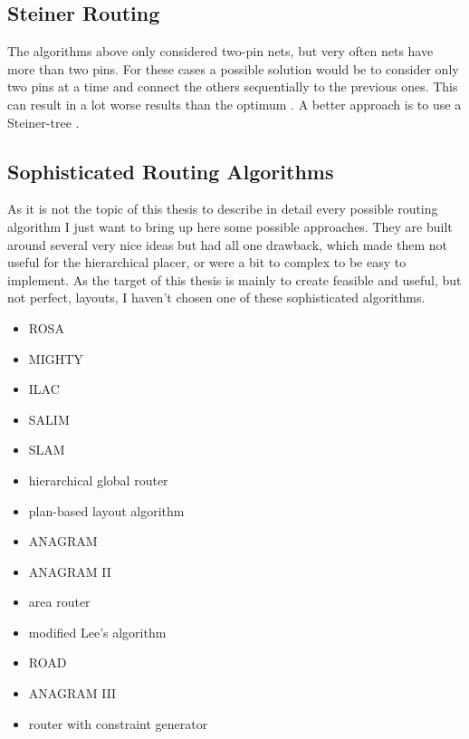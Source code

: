 \subsection{Steiner Routing}
\label{subsec:steiner_routing}
The algorithms above only considered two-pin nets, but very often nets have more than two pins. For these cases a possible solution would be to consider only two pins at a time and connect the others sequentially to the previous ones. This can result in a lot worse results than the optimum \cite[p. 701]{kaufmann:electronic_design_automation}. A better approach is to use a Steiner-tree \cite[page 153]{springer:eda_analog_routing}.

\subsection{Sophisticated Routing Algorithms}
As it is not the topic of this thesis to describe in detail every possible routing algorithm I just want to bring up here some possible approaches. They are built around several very nice ideas but had all one drawback, which made them not useful for the hierarchical placer, or were a bit to complex to be easy to implement. As the target of this thesis is mainly to create feasible and useful, but not perfect, layouts, I haven't chosen one of these sophisticated algorithms.
\begin{itemize}
\item ROSA \cite[page 165]{springer:eda_analog_routing}
\item MIGHTY \cite[page 166]{springer:eda_analog_routing}
\item ILAC \cite[page 167]{springer:eda_analog_routing}
\item SALIM \cite[page 167]{springer:eda_analog_routing}
\item SLAM \cite[page 167]{springer:eda_analog_routing}
\item hierarchical global router \cite[page 168]{springer:eda_analog_routing}
\item plan-based layout algorithm \cite[page 168]{springer:eda_analog_routing}
\item ANAGRAM \cite[page 168]{springer:eda_analog_routing}
\item ANAGRAM II \cite[page 168]{springer:eda_analog_routing}
\item area router \cite[page 168]{springer:eda_analog_routing}
\item modified Lee's algorithm \cite[page 170]{springer:eda_analog_routing}
\item ROAD \cite[page 170]{springer:eda_analog_routing}
\item ANAGRAM III \cite[page 170]{springer:eda_analog_routing}
\item router with constraint generator \cite[page 172]{springer:eda_analog_routing}
\end{itemize}

